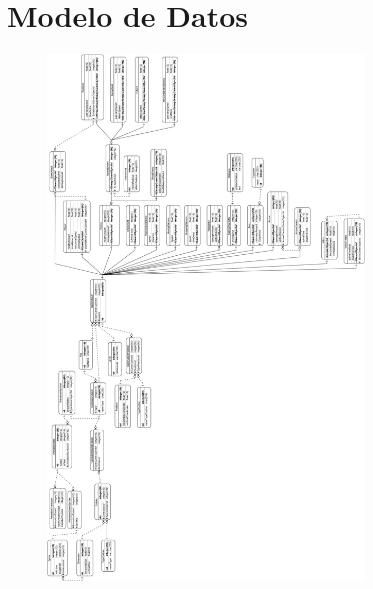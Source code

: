 \chapter{Modelo de Datos} \label{Anexo:ModeloDatos}

\begin{figure}[H]
    \centering
    \includegraphics[width=0.75\textwidth]{Anexos/ModeloDatos/Yolotl02.png}
\end{figure}